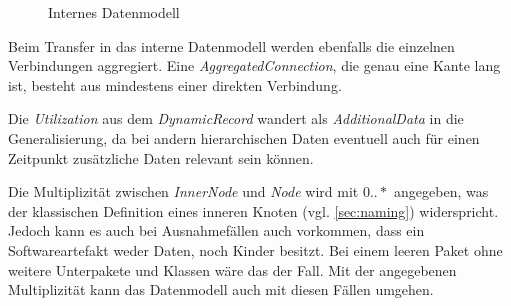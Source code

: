 \begin{figure}[htb]
  \caption{Internes Datenmodell}
  \label{fig:internal-model}
\end{figure}

Beim Transfer in das interne Datenmodell werden ebenfalls die einzelnen Verbindungen aggregiert. Eine \textit{AggregatedConnection}, die genau eine Kante lang ist, besteht aus mindestens einer direkten Verbindung.

Die \textit{Utilization} aus dem \textit{DynamicRecord} wandert als \textit{AdditionalData} in die Generalisierung, da bei andern hierarchischen Daten eventuell auch für einen Zeitpunkt zusätzliche Daten relevant sein können.

Die Multiplizität zwischen \textit{InnerNode} und \textit{Node} wird mit $0..*$ angegeben, was der klassischen Definition eines inneren Knoten (vgl. \ref{sec:naming}) widerspricht. Jedoch kann es auch bei Ausnahmefällen auch vorkommen, dass ein Softwareartefakt weder Daten, noch Kinder besitzt. Bei einem leeren Paket ohne weitere Unterpakete und Klassen wäre das der Fall. Mit der angegebenen Multiplizität kann das Datenmodell auch mit diesen Fällen umgehen.

